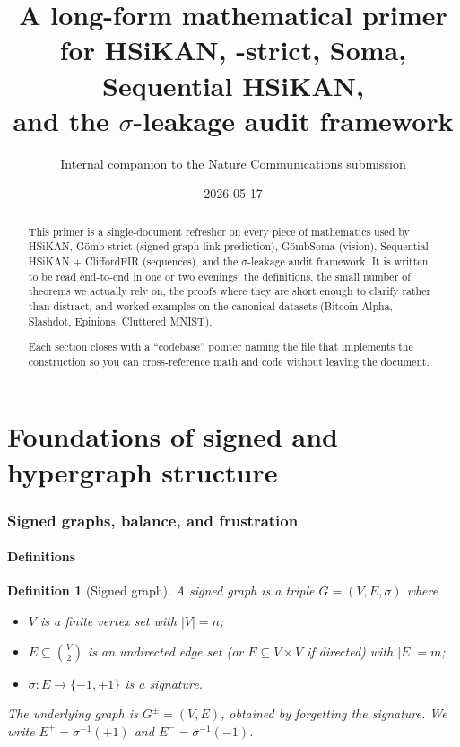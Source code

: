\documentclass[11pt,a4paper]{article}
\title{
  A long-form mathematical primer\\
  for HSiKAN, \GS{}-strict, \GS{}Soma, Sequential HSiKAN,\\
  and the $\sigma$-leakage audit framework
}
\author{Internal companion to the Nature Communications submission}
\date{2026-05-17}
\newtheorem{definition}[theorem]{Definition}
\theoremstyle{remark}
\newcommand{\GS}{G\"omb}
\begin{document}
\maketitle

\begin{abstract}
This primer is a single-document refresher on every piece of
mathematics used by HSiKAN, \GS{}-strict (signed-graph link
prediction), \GS{}Soma (vision), Sequential HSiKAN $+$ CliffordFIR
(sequences), and the $\sigma$-leakage audit framework. It is
written to be read end-to-end in one or two evenings: the
definitions, the small number of theorems we actually rely on,
the proofs where they are short enough to clarify rather than
distract, and worked examples on the canonical datasets
(Bitcoin Alpha, Slashdot, Epinions, Cluttered MNIST).

Each section closes with a ``codebase'' pointer naming the file
that implements the construction so you can cross-reference math
and code without leaving the document.
\end{abstract}

\tableofcontents

\bigskip\bigskip
\part{Foundations of signed and hypergraph structure}

\section{Signed graphs, balance, and frustration}\label{sec:signed-graphs}

\subsection{Definitions}

\begin{definition}[Signed graph]
A \emph{signed graph} is a triple $G = (V, E, \sigma)$ where
\begin{itemize}[leftmargin=*]
\item $V$ is a finite vertex set with $|V| = n$;
\item $E \subseteq \binom{V}{2}$ is an undirected edge set (or
      $E \subseteq V \times V$ if directed) with $|E| = m$;
\item $\sigma : E \to \{-1, +1\}$ is a \emph{signature}.
\end{itemize}
The \emph{underlying graph} is $G^\pm = (V, E)$, obtained by
forgetting the signature. We write $E^+ = \sigma^{-1}(+1)$ and
$E^- = \sigma^{-1}(-1)$.
\end{definition}
\end{document}
